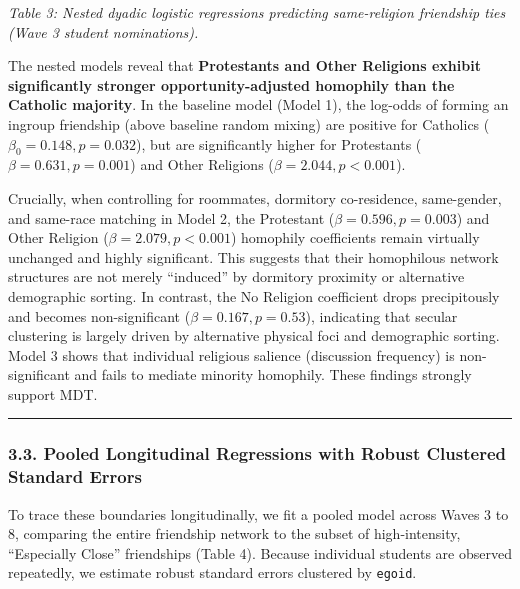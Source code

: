 \documentclass[
  letterpaper,
  DIV=11,
  numbers=noendperiod]{scrartcl}
\begin{document}
\emph{Table 3: Nested dyadic logistic regressions predicting
same-religion friendship ties (Wave 3 student nominations).}

The nested models reveal that \textbf{Protestants and Other Religions
exhibit significantly stronger opportunity-adjusted homophily than the
Catholic majority}. In the baseline model (Model 1), the log-odds of
forming an ingroup friendship (above baseline random mixing) are
positive for Catholics (\(\beta_0 = 0.148, p = 0.032\)), but are
significantly higher for Protestants (\(\beta = 0.631, p = 0.001\)) and
Other Religions (\(\beta = 2.044, p < 0.001\)).

Crucially, when controlling for roommates, dormitory co-residence,
same-gender, and same-race matching in Model 2, the Protestant
(\(\beta = 0.596, p = 0.003\)) and Other Religion
(\(\beta = 2.079, p < 0.001\)) homophily coefficients remain virtually
unchanged and highly significant. This suggests that their homophilous
network structures are not merely ``induced'' by dormitory proximity or
alternative demographic sorting. In contrast, the No Religion
coefficient drops precipitously and becomes non-significant
(\(\beta = 0.167, p = 0.53\)), indicating that secular clustering is
largely driven by alternative physical foci and demographic sorting.
Model 3 shows that individual religious salience (discussion frequency)
is non-significant and fails to mediate minority homophily. These
findings strongly support MDT.

\begin{center}\rule{0.5\linewidth}{0.5pt}\end{center}

\subsubsection{3.3. Pooled Longitudinal Regressions with Robust
Clustered Standard
Errors}\label{pooled-longitudinal-regressions-with-robust-clustered-standard-errors}

To trace these boundaries longitudinally, we fit a pooled model across
Waves 3 to 8, comparing the entire friendship network to the subset of
high-intensity, ``Especially Close'' friendships (Table 4). Because
individual students are observed repeatedly, we estimate robust standard
errors clustered by \texttt{egoid}.
\end{document}
